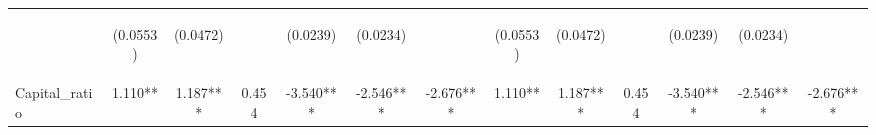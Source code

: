 \documentclass[]{article}
\begin{document}
\begin{center}
\begin{tabular}{lcccccccccccc}
\vspace{4pt} & \begin{footnotesize}(0.0553)\end{footnotesize} & \begin{footnotesize}(0.0472)\end{footnotesize} & \begin{footnotesize}\end{footnotesize} & \begin{footnotesize}(0.0239)\end{footnotesize} & \begin{footnotesize}(0.0234)\end{footnotesize} & \begin{footnotesize}\end{footnotesize} & \begin{footnotesize}(0.0553)\end{footnotesize} & \begin{footnotesize}(0.0472)\end{footnotesize} & \begin{footnotesize}\end{footnotesize} & \begin{footnotesize}(0.0239)\end{footnotesize} & \begin{footnotesize}(0.0234)\end{footnotesize} & \begin{footnotesize}\end{footnotesize} \\
Capital\_ratio & 1.110** & 1.187*** & 0.454 & -3.540*** & -2.546*** & -2.676*** & 1.110** & 1.187*** & 0.454 & -3.540*** & -2.546*** & -2.676*** \\

\end{tabular}
\end{center}
\end{document}
